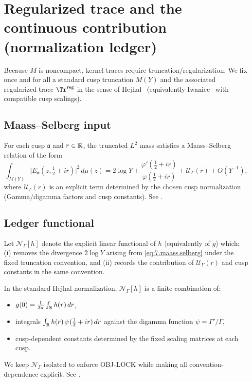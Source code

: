 \section{Regularized trace and the continuous contribution (normalization ledger)}
\label{sec:ch7-regtrace}

\noindent
Because $M$ is noncompact, kernel traces require truncation/regularization.
We fix once and for all a standard cusp truncation $M(Y)$ and the associated regularized trace $\Tr^{\mathrm{reg}}$
in the sense of Hejhal~\cite[Vol.~I, Ch.~2]{Hejhal1983} (equivalently Iwaniec~\cite{Iwaniec2002} with compatible cusp scalings).

\subsection{Maass--Selberg input}\label{subsec:ch7-maass-selberg}

For each cusp $\mathfrak a$ and $r\in\mathbb{R}$, the truncated $L^2$ mass satisfies a Maass--Selberg relation of the form
\begin{equation}\label{eq:7.maass.selberg}
\int_{M(Y)} \big|E_{\mathfrak a}(z,\tfrac12+ir)\big|^2\,d\mu(z)
=2\log Y
+\frac{\varphi'(\tfrac12+ir)}{\varphi(\tfrac12+ir)}
+\mathcal U_\Gamma(r)
+O(Y^{-1}),
\end{equation}
where $\mathcal U_\Gamma(r)$ is an explicit term determined by the chosen cusp normalization
(Gamma/digamma factors and cusp constants). See \cite{Hejhal1983,Iwaniec2002}.

\subsection{Ledger functional}\label{subsec:ch7-ledger}

\begin{definition}\label{def:7.ledger.NGamma}
Let $\mathcal N_\Gamma[h]$ denote the explicit linear functional of $h$ (equivalently of $g$) which:
(i) removes the divergence $2\log Y$ arising from \eqref{eq:7.maass.selberg} under the fixed truncation convention,
and (ii) records the contribution of $\mathcal U_\Gamma(r)$ and cusp constants in the same convention.
\end{definition}

\begin{remark}\label{rem:7.ledger.contents}
In the standard Hejhal normalization, $\mathcal N_\Gamma[h]$ is a finite combination of:
\begin{itemize}
\item $g(0)=\frac{1}{2\pi}\int_{\mathbb{R}} h(r)\,dr$,
\item integrals $\int_{\mathbb{R}} h(r)\,\psi(\tfrac12+ir)\,dr$ against the digamma function $\psi=\Gamma'/\Gamma$,
\item cusp-dependent constants determined by the fixed scaling matrices at each cusp.
\end{itemize}
We keep $\mathcal N_\Gamma$ isolated to enforce OBJ-LOCK while making all convention-dependence explicit. See \cite{Hejhal1983}.
\end{remark}

